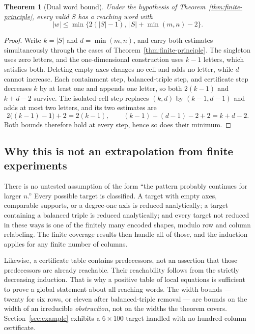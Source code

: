 \documentclass[11pt,letterpaper]{article}
\numberwithin{equation}{section}
\newtheorem{theorem}{Theorem}[section]
\theoremstyle{definition}
\theoremstyle{remark}
\begin{document}
\begin{theorem}[Dual word bound]\label{thm:dual-bound}
Under the hypothesis of Theorem~\ref{thm:finite-principle}, every valid $S$
has a reaching word with
\begin{equation}\label{eq:dual-bound}
 |w|\le\min\bigl\{2(|S|-1),\ |S|+\min(m,n)-2\bigr\}.
\end{equation}
\end{theorem}
\begin{proof}
Write $k=|S|$ and $d=\min(m,n)$, and carry both estimates simultaneously
through the cases of Theorem~\ref{thm:finite-principle}. The singleton uses
zero letters, and the one-dimensional construction uses $k-1$ letters, which
satisfies both. Deleting empty axes changes no cell and adds no letter, while
$d$ cannot increase. Each containment step, balanced-triple step, and
certificate step decreases $k$ by at least one and appends one letter, so both
$2(k-1)$ and $k+d-2$ survive. The isolated-cell step replaces $(k,d)$ by
$(k-1,d-1)$ and adds at most two letters, and its two estimates are
\[
 2\bigl((k-1)-1\bigr)+2=2(k-1),\qquad
 (k-1)+(d-1)-2+2=k+d-2 .
\]
Both bounds therefore hold at every step, hence so does their minimum.
\end{proof}

\subsection{Why this is not an extrapolation from finite experiments}
\label{sec:not-extrapolation}
There is no untested assumption of the form ``the pattern probably continues
for larger $n$.'' Every possible target is classified. A target with empty
axes, comparable supports, or a degree-one axis is reduced analytically; a
target containing a balanced triple is reduced analytically; and every target
not reduced in these ways is one of the finitely many encoded shapes, modulo
row and column relabeling. The finite coverage results then handle all of
those, and the induction applies for any finite number of columns.

Likewise, a certificate table contains predecessors, not an assertion that
those predecessors are already reachable. Their reachability follows from the
strictly decreasing induction. That is why a positive table of local
equations is sufficient to prove a global statement about all reaching words.
The width bounds --- twenty for six rows, or eleven after balanced-triple
removal --- are bounds on the width of an irreducible \emph{obstruction}, not
on the widths the theorem covers. Section~\ref{sec:example} exhibits a
$6\times100$ target handled with no hundred-column certificate.
\end{document}
